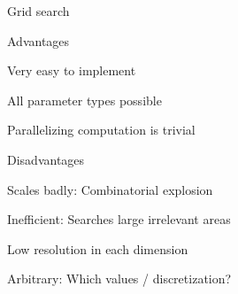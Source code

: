\begin{frame}{Grid search}
\framebreak

\begin{blocki}{Advantages}
\item Very easy to implement
\item All parameter types possible
\item Parallelizing computation is trivial
\end{blocki}

\begin{blocki}{Disadvantages}
\item Scales badly: Combinatorial explosion
\item Inefficient: Searches large irrelevant areas
\item Low resolution in each dimension
\item Arbitrary: Which values / discretization?
\end{blocki}
\end{frame}


